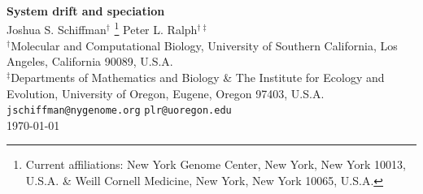\documentclass{article}
\newcommand{\1}{\mathbbm{1}}
\begin{document}
\linenumbers

{\centering
{\Huge \bf System drift and speciation} \\ \vspace{0.75cm}
Joshua S. Schiffman$^{\dagger}$ \footnote{Current affiliations: New York Genome Center, New York, New York 10013, U.S.A. \& Weill Cornell Medicine, New York, New York 10065, U.S.A.} \qquad Peter L. Ralph$^{\dagger \ddagger}$ \\ \vspace{0.5cm}
$^{\dagger}${\footnotesize {Molecular and Computational Biology, University of Southern California, Los Angeles, California 90089, U.S.A. \\
$^{\ddagger}$Departments of Mathematics and Biology \& The Institute for Ecology and Evolution, University of Oregon, Eugene, Oregon 97403, U.S.A.}} \\ \vspace{0.5cm}
{\small \texttt{jschiffman@nygenome.org} \qquad 
\texttt{plr@uoregon.edu}} \\ \vspace{0.5cm}
\small \today \\
\vspace{0.25cm}
}

%
%
%
%
%
%
%
%
%
%
%
%
%
%
%
\end{document}
